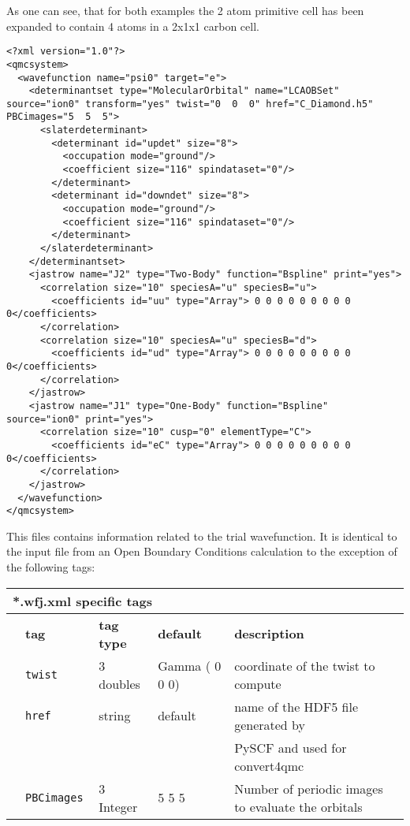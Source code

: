   As one can see, that for both examples the 2 atom primitive cell has been expanded to contain 4 atoms in a 2x1x1 carbon cell.
\begin{lstlisting}[style=XML,caption=CDiamond.wfj-Twist0.xml. This file contains the trial wavefunction.]
<?xml version="1.0"?>
<qmcsystem>
  <wavefunction name="psi0" target="e">
    <determinantset type="MolecularOrbital" name="LCAOBSet" source="ion0" transform="yes" twist="0  0  0" href="C_Diamond.h5" PBCimages="5  5  5">
      <slaterdeterminant>
        <determinant id="updet" size="8">
          <occupation mode="ground"/>
          <coefficient size="116" spindataset="0"/>
        </determinant>
        <determinant id="downdet" size="8">
          <occupation mode="ground"/>
          <coefficient size="116" spindataset="0"/>
        </determinant>
      </slaterdeterminant>
    </determinantset>
    <jastrow name="J2" type="Two-Body" function="Bspline" print="yes">
      <correlation size="10" speciesA="u" speciesB="u">
        <coefficients id="uu" type="Array"> 0 0 0 0 0 0 0 0 0 0</coefficients>
      </correlation>
      <correlation size="10" speciesA="u" speciesB="d">
        <coefficients id="ud" type="Array"> 0 0 0 0 0 0 0 0 0 0</coefficients>
      </correlation>
    </jastrow>
    <jastrow name="J1" type="One-Body" function="Bspline" source="ion0" print="yes">
      <correlation size="10" cusp="0" elementType="C">
        <coefficients id="eC" type="Array"> 0 0 0 0 0 0 0 0 0 0</coefficients>
      </correlation>
    </jastrow>
  </wavefunction>
</qmcsystem>
 \end{lstlisting}
This files contains information related to the trial wavefunction. It is identical to the input file from an Open Boundary Conditions calculation to the exception of the following tags:\\
\begin{table}[h]
\begin{center}
\begin{tabularx}{\textwidth}{l l l l l }
\hline
\multicolumn{5}{l}{*.wfj.xml specific tags} \\
\hline
   &   \bfseries tag     & \bfseries tag type & \bfseries default   & \bfseries description \\
   &   \texttt{twist             } &  3 doubles  & Gamma ( 0 0 0)& coordinate of the twist to compute\\
   &   \texttt{href             } &  string  & default& name of the HDF5 file generated by\\ 
   &                              &          &        &  PySCF and used for convert4qmc\\  
   &   \texttt{PBCimages            } &  3 Integer   & 5 5 5  & Number of periodic images to evaluate the orbitals\\
    \hline
    \end{tabularx}
\end{center}
\end{table}

